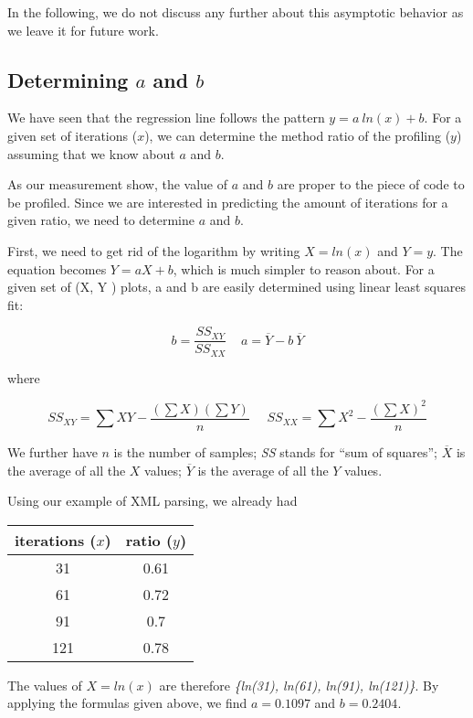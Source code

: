 \documentclass{sig-alternate}
\begin{document}
In the following, we do not discuss any further about this asymptotic behavior as we leave it for future work.

\subsection{Determining $a$ and $b$}

We have seen that the regression line follows the pattern $y = a~ln(x) + b$. For a given set of iterations ($x$), we can determine the method ratio of the profiling ($y$) assuming that we know about $a$ and $b$. 

As our measurement show, the value of $a$ and $b$ are proper to the piece of code to be profiled. Since we are interested in predicting the amount of iterations for a given ratio, we need to determine $a$ and $b$. 

First, we need to get rid of the logarithm by writing $X = ln(x)$ and $Y = y$. The equation becomes $Y = a X + b$, which is much simpler to reason about. For a given set of (X, Y ) plots, a and b are easily determined using linear least squares fit:

\[
b = \frac{SS_{XY}}{SS_{XX}} ~~~~~ a = \overline{Y} - b~\overline{Y}
\]

where 

\[
\textit{SS}_{XY} = \sum XY - \frac{(\sum X)(\sum Y)}{n}~~~~~~\textit{SS}_{XX} = \sum X^2 - \frac{(\sum X)^2}{n}
\]

We further have $n$ is the number of samples; 
\textit{SS} stands for ``sum of squares'';
$\overline{X}$ is the average of all the $X$ values;
$\overline{Y}$ is the average of all the $Y$ values.

Using our example of XML parsing, we already had 

\begin{center}
\begin{tabular}{|c|c|}
\hline
iterations ($x$) & ratio ($y$) \\\hline
31		& 0.61 \\
61		& 0.72\\
91		& 0.7\\
121		& 0.78\\
\hline
\end{tabular}
\end{center}

The values of $X = ln(x)$ are therefore \textit{\{ln(31), ln(61), ln(91), ln(121)\}}.
By applying the formulas given above, we find $a = 0.1097$ and $b = 0.2404$. 
\end{document}
